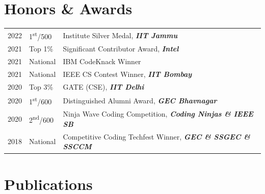 \documentclass[]{deedy-resume-openfont}
\begin{document}
\begin{minipage}[t]{0.61\textwidth}
\section{Honors \& Awards} 
\begin{tabular}{rll}
2022	     & 1\textsuperscript{st}/500  & Institute Silver Medal,  \footnotesize \textit{\textbf{IIT Jammu}}\\
2021	     & Top 1\%  & Significant Contributor Award,  \footnotesize \textit{\textbf{Intel}}\\
2021     & National & IBM CodeKnack Winner \\
2021     & National & IEEE CS Contest Winner, \footnotesize \textit{\textbf{IIT Bombay}} \\
2020	     & Top 3\%  & GATE (CSE), \footnotesize \textit{\textbf{IIT Delhi}}\\
2020	     & 1\textsuperscript{st}/600  & Distinguished Alumni Award, \footnotesize \textit{\textbf{GEC Bhavnagar}}\\
2020     & 2\textsuperscript{nd}/600 & Ninja Wave Coding Competition, \footnotesize \textit{\textbf{Coding Ninjas \& IEEE SB}} \\
2018     & National & Competitive Coding Techfest Winner,  \footnotesize \textit{\textbf{GEC \& SSGEC \& SSCCM}}
\end{tabular}
\sectionsep


\section{Publications} 
\renewcommand\refname{\vskip -1.5em} %


\nocite{*}

\end{minipage} 
\end{document}
